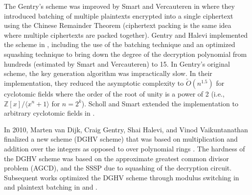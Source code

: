 The Gentry's scheme was improved by Smart and Vercauteren in \cite{SV09-batch} where they introduced batching of multiple plaintexts encrypted into a single ciphertext using the Chinese Remainder Theorem (ciphertext packing is the same idea where multiple ciphertexts are packed together). Gentry and Halevi implemented the scheme in \cite{GS10-impl}, including the use of the batching technique and an optimized squashing technique to bring down the degree of the decryption polynomial from hundreds (estimated by Smart and Vercauteren) to 15. In Gentry's original scheme, the key generation algorithm was impractically slow. In their implementation, they reduced the asymptotic complexity to $\tilde{O}\left(n^{1.5}\right)$ for cyclotomic fields where the order of the root of unity is a power of 2 (i.e., $\mathbb{Z}[x] /\langle x^{n} + 1\rangle$ for $n = 2^k$). Scholl and Smart extended the implementation to arbitrary cyclotomic fields in \cite{SS11-keygen}.

In 2010, Marten van Dijk, Craig Gentry, Shai Halevi, and Vinod Vaikuntanathan finalized a new scheme (DGHV scheme) that was based on multiplication and addition over the integers as opposed to over polynomial rings \cite{DGHV10}. The hardness of the DGHV scheme was based on the approximate greatest common divisor problem (AGCD), and the SSSP due to squashing of the decryption circuit. Subsequent works optimized the DGHV scheme through modulus switching in \cite{DGHV-modswitch} and plaintext batching in \cite{DGHV-batch1} and \cite{DGHV-batch2}.

